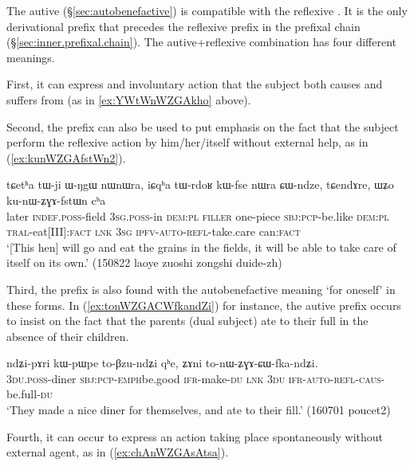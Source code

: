 The autive  (§\ref{sec:autobenefactive}) is compatible with the reflexive . It is the only derivational prefix that precedes the reflexive prefix in the prefixal chain (§\ref{sec:inner.prefixal.chain}). The autive+reflexive combination has four different meanings.

First, it can express and involuntary action that the subject both causes and suffers from (as in \ref{ex:YWtWnWZGAkho} above).

Second, the  prefix can also be used to put emphasis on the fact that the subject perform the reflexive action by him/her/itself without external help, as in (\ref{ex:kunWZGAfstWn2}).

\begin{exe}
\ex \label{ex:kunWZGAfstWn2}
\gll  tɕetʰa tɯ-ji ɯ-ŋgɯ nɯnɯra, iɕqʰa tɯ-rdoʁ kɯ-fse nɯra ɕɯ-ndze, tɕendɤre, ɯʑo ku-nɯ-ʑɣɤ-fstɯn cʰa   \\
later \textsc{indef}.\textsc{poss}-field \textsc{3sg}.\textsc{poss}-in \textsc{dem}:\textsc{pl} \textsc{filler} one-piece \textsc{sbj}:\textsc{pcp}-be.like \textsc{dem}:\textsc{pl} \textsc{tral}-eat[III]:\textsc{fact} \textsc{lnk} \textsc{3sg} \textsc{ipfv}-\textsc{auto}-\textsc{refl}-take.care can:\textsc{fact}   \\
\glt `[This hen] will go and eat the grains in the fields, it will be able to take care of itself on its own.' (150822 laoye zuoshi zongshi duide-zh)
\end{exe} 

Third, the  prefix is also found with the autobenefactive meaning `for oneself' in these forms. In (\ref{ex:tonWZGACWfkandZi}) for instance, the autive prefix occurs to insist on the fact that the parents (dual subject) ate to their full in the absence of their children.

\begin{exe}
\ex \label{ex:tonWZGACWfkandZi}
\gll ndʑi-pɤri kɯ-pɯ\redp{}pe to-βzu-ndʑi qʰe, ʑɤni to-nɯ-ʑɣɤ-ɕɯ-fka-ndʑi. \\
\textsc{3du}.\textsc{poss}-diner \textsc{sbj}:\textsc{pcp}-\textsc{emph}\redp{}be.good \textsc{ifr}-make-\textsc{du} \textsc{lnk} \textsc{3du} \textsc{ifr}-\textsc{auto}-\textsc{refl}-\textsc{caus}-be.full-\textsc{du} \\
\glt `They made a nice diner for themselves, and ate to their fill.' (160701 poucet2) 
\end{exe}

Fourth, it can occur to express an action taking place spontaneously without external agent, as in (\ref{ex:chAnWZGAsAtsa}).

